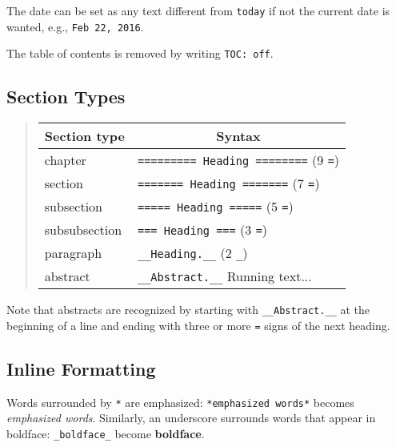\documentclass[twoside]{article}
\begin{document}
The date can be set as any text different from {\fontsize{10pt}{10pt}\verb!today!} if not the
current date is wanted, e.g., {\fontsize{10pt}{10pt}\verb!Feb 22, 2016!}.

The table of contents is removed by writing {\fontsize{10pt}{10pt}\verb!TOC: off!}.

\subsection{Section Types}

\label{quick:sections}


\begin{quote}\begin{tabular}{ll}
\hline
\multicolumn{1}{c}{Section type} & \multicolumn{1}{c}{Syntax} \\
\hline
chapter                              & {\fontsize{10pt}{10pt}\verb!========= Heading ========!} (9 {\fontsize{10pt}{10pt}\verb!=!}) \\
section                              & {\fontsize{10pt}{10pt}\verb!======= Heading =======!}    (7 {\fontsize{10pt}{10pt}\verb!=!}) \\
subsection                           & {\fontsize{10pt}{10pt}\verb!===== Heading =====!}        (5 {\fontsize{10pt}{10pt}\verb!=!}) \\
subsubsection                        & {\fontsize{10pt}{10pt}\verb!=== Heading ===!}            (3 {\fontsize{10pt}{10pt}\verb!=!}) \\
paragraph                            & {\fontsize{10pt}{10pt}\verb!__Heading.__!}               (2 {\fontsize{10pt}{10pt}\verb!_!}) \\
abstract                             & {\fontsize{10pt}{10pt}\verb!__Abstract.__!} Running text...      \\
\hline
\end{tabular}\end{quote}

\noindent
Note that abstracts are recognized by starting with {\fontsize{10pt}{10pt}\verb!__Abstract.__!} at
the beginning of a line and ending with three or more {\fontsize{10pt}{10pt}\verb!=!} signs of the
next heading.

\subsection{Inline Formatting}

Words surrounded by {\fontsize{10pt}{10pt}\verb!*!} are emphasized: {\fontsize{10pt}{10pt}\verb!*emphasized words*!} becomes
\emph{emphasized words}. Similarly, an underscore surrounds words that
appear in boldface: {\fontsize{10pt}{10pt}\verb!_boldface_!} become \textbf{boldface}.
\end{document}
